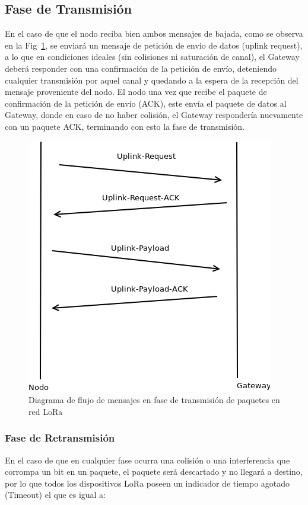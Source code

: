 \begin{justify}
\subsection{Fase de Transmisión}

En el caso de que el nodo reciba bien ambos mensajes de bajada, como se observa en la Fig~\ref{trans:1}, se enviará un mensaje de petición de envío de datos (uplink request), a lo que en condiciones ideales (sin colisiones ni saturación de canal), el Gateway deberá responder con una confirmación de la petición de envío, deteniendo cualquier transmisión por aquel canal y quedando a la espera de la recepción del mensaje proveniente del nodo. El nodo una vez que recibe el paquete de confirmación de la petición de envío (ACK), este envía el paquete de datos al Gateway, donde en caso de no haber colisión, el Gateway respondería nuevamente con un paquete ACK, terminando con esto la fase de transmisión.\\


\begin{figure}[!ht]
\centering
\includegraphics[scale=0.6]{diagramas/transmit}
\caption{Diagrama de flujo de mensajes en fase de transmisión de paquetes en red LoRa}
\label{trans:1}
\end{figure}
\newpage
\subsubsection{Fase de Retransmisión}
\justify
En el caso de que en cualquier fase ocurra una colisión o una interferencia que corrompa un bit en un paquete, el paquete será descartado y no llegará a destino, por lo que todos los dispositivos LoRa poseen un indicador de tiempo agotado (Timeout) el que es igual a:
 

\end{justify}
